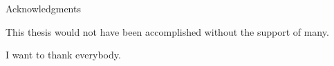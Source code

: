 \thispagestyle{empty}


\begin{center}
{ Acknowledgments}
\end{center}

\vspace{1cm}

This thesis would not have been accomplished without the support of many.

I want to thank everybody.

\cleardoublepage{}
